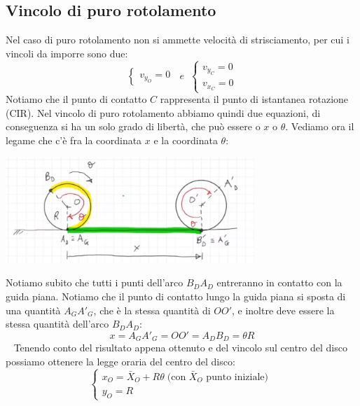 \subsection{Vincolo di puro rotolamento}
Nel caso di puro rotolamento non si ammette velocità di strisciamento, per cui i vincoli da imporre sono due:
\[
    \begin{cases}
        v_{y_O} = 0
    \end{cases}\;\;e\;\;\begin{cases}
        v_{y_C} = 0\\
        v_{x_C} = 0
    \end{cases}
\]
Notiamo che il punto di contatto $C$ rappresenta il punto di istantanea rotazione (CIR).
\newline
\newline
Nel vincolo di puro rotolamento abbiamo quindi due equazioni, di conseguenza si ha un solo grado di libertà, che può essere o $x$ o $\theta$.\newline
\newline
Vediamo ora il legame che c'è fra la coordinata $x$ e la coordinata $\theta$:
\begin{center}
    \includegraphics[height=4cm]{../lezione4/img2.JPG}
\end{center}
Notiamo subito che tutti i punti dell'arco $B_DA_D$ entreranno in contatto con la guida piana.\newline
Notiamo che il punto di contatto lungo la guida piana si sposta di una quantità $A_G A'_G$, che è la stessa quantità di $OO'$, e inoltre deve essere la stessa quantità dell'arco $B_D A_D$:
\[
    x = A_GA'_G = OO' = A_D B_D = \theta R
\]
\ \newline
Tenendo conto del risultato appena ottenuto e del vincolo sul centro del disco possiamo ottenere la legge oraria del centro del disco:
\[
    \begin{cases}
        x_O = \bar{X}_O + R \theta \;\text{(con $\bar{X}_O$ punto iniziale)}\;\\
        y_O = R
    \end{cases}
\]
